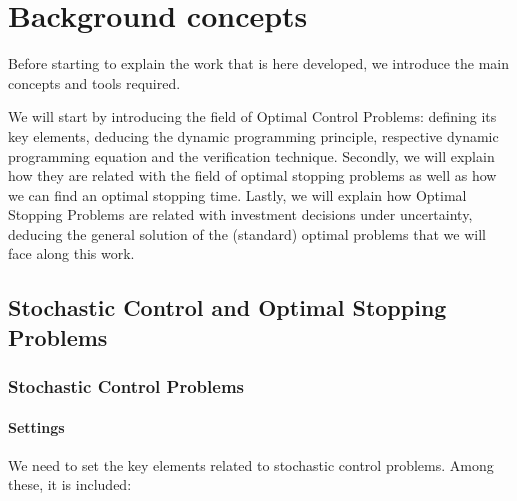 
\chapter{Background concepts}
\label{chapter:bc1}

Before starting to explain the work that is here developed, we introduce the main concepts and tools required.

We will start by introducing the field of Optimal Control Problems: defining its key elements, deducing the dynamic programming principle, respective dynamic programming equation and the verification technique. Secondly, we will explain how they are related with the field of optimal stopping problems as well as how we can find an optimal stopping time. Lastly, we will explain how Optimal Stopping Problems are related with investment decisions under uncertainty, deducing the general solution of the (standard) optimal problems that we will face along this work.


\section{Stochastic Control and Optimal Stopping Problems}
\label{section:scop}	

\subsection{Stochastic Control Problems}
\label{section:control}

\subsubsection{Settings}

We need to set the key elements related to stochastic control problems. Among these, it is included:

